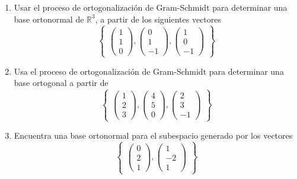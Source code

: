 \documentclass[
]{article}
\begin{document}
\begin{enumerate}
\def\labelenumi{\alph{enumi})}
\item
  Usar el proceso de ortogonalización de Gram-Schmidt para determinar
  una base ortonormal de \(\mathbb{R}^3\), a partir de los siguientes
  vectores \[
  \begin{Bmatrix}
    \begin{pmatrix}1\\ 1 \\ 0 \end{pmatrix},
    \begin{pmatrix}0\\ 1 \\-1 \end{pmatrix},
    \begin{pmatrix}1\\ 0 \\-1 \end{pmatrix}
  \end{Bmatrix}
  \]
\item
  Usa el proceso de ortogonalización de Gram-Schmidt para determinar una
  base ortogonal a partir de \[
  \begin{Bmatrix}
    \begin{pmatrix} 1\\ 2 \\ 3 \end{pmatrix},
    \begin{pmatrix} 4\\ 5 \\ 0 \end{pmatrix},
    \begin{pmatrix} 2\\ 3 \\-1 \end{pmatrix}
  \end{Bmatrix}
  \]
\item
  Encuentra una base ortonormal para el subespacio generado por los
  vectores \[
  \begin{Bmatrix}
    \begin{pmatrix} 0\\ 2 \\ 1 \end{pmatrix},
    \begin{pmatrix} 1\\ -2 \\ 1 \end{pmatrix}
  \end{Bmatrix}
  \]
\end{enumerate}
\end{document}
